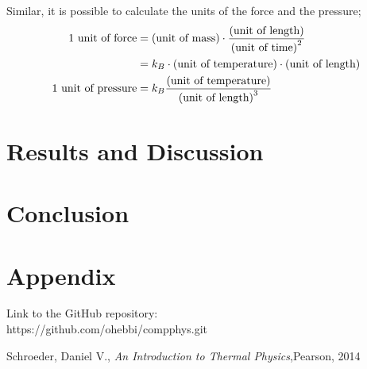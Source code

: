 \documentclass{article}
\begin{document}
Similar, it is possible to calculate the units of the force and the pressure;
\begin{align}
	\textnormal{1 unit of force} &= \textnormal{(unit of mass)}\cdot\frac{\textnormal{(unit of length)}}{\textnormal{(unit of time)}^2}\\
	 &= k_B \cdot \textnormal{(unit of temperature)}\cdot\textnormal{(unit of length)}\\
	\textnormal{1 unit of pressure} &=k_B \frac{\textnormal{(unit of temperature)}}{\textnormal{(unit of length)}^3}
\end{align}


\section{Results and Discussion}





\section{Conclusion}


\section{Appendix}
Link to the GitHub repository:\\

https://github.com/ohebbi/compphys.git

\begin{thebibliography}{}
Schroeder, Daniel V., \textit{An Introduction to Thermal Physics},Pearson, 2014\\
\end{thebibliography}
\end{document}
